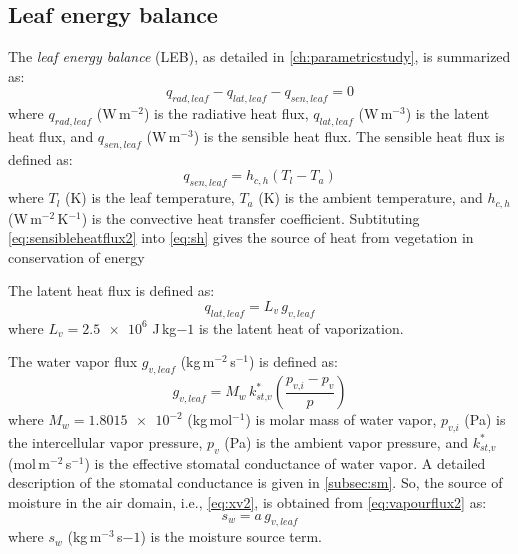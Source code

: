 \subsection*{Leaf energy balance}

The \textit{leaf energy balance} (LEB), as detailed in \cref{ch:parametricstudy}, is summarized as:
\begin{equation}
{q_{\mathit{rad},\mathit{leaf}}} - {q_{\mathit{lat},\mathit{leaf}}} - {q_{\mathit{sen},\mathit{leaf}}} = 0
\label{eq:energybalance2}
\end{equation}
where ${q_{\mathit{rad},\mathit{leaf}}}$ (W\,m$^{-2}$) is the radiative heat flux, ${q_{\mathit{lat},\mathit{leaf}}}$ (W\,m$^{-3}$) is the latent heat flux, and ${q_{\mathit{sen},\mathit{leaf}}}$ (W\,m$^{-3}$) is the sensible heat flux. The sensible heat flux is defined as:
\begin{equation}
{q_{\mathit{sen,leaf}}} = {h_{c,h}} \left( {{T_{\mathit{l}}} - T_a} \right)
\label{eq:sensibleheatflux2}
\end{equation}
where $T_l$ (K) is the leaf temperature, $T_a$ (K) is the ambient temperature, and ${h_{c,h}}$ (W\,m$^{-2}$\,K$^{-1}$) is the convective heat transfer coefficient. Subtituting \cref{eq:sensibleheatflux2} into \cref{eq:sh} gives the source of heat from vegetation in conservation of energy

The latent heat flux is defined as:
\begin{equation}
{q_{lat,leaf}} = {L_v} \, {g_{v,leaf}}
\label{eq:latentheatflux2}
\end{equation}
where $L_v=\num{2.5e6}$ J\,kg${-1}$ is the latent heat of vaporization. 

The water vapor flux $g_{v,leaf}$ (kg\,m$^{-2}$\,s$^{-1}$) is defined as:
\begin{equation}
{g_{\mathit{v,leaf}}} = M_w\, k_{\textit{st,v}}^* \left( \frac{p_{\textit{v,i}} - {p_v}}{p} \right)
\label{eq:vapourflux2}
\end{equation}
where $M_w = \num{1.8015e-2}$ (kg\,mol$^{-1}$) is molar mass of water vapor, $p_{\textit{v,i}}$ (Pa) is the intercellular vapor pressure, $p_v$ (Pa) is the ambient vapor pressure, and $k_{\textit{st,v}}^*$ (mol\,m$^{-2}$\,s$^{-1}$) is the effective stomatal conductance of water vapor. A detailed description of the stomatal conductance is given in \cref{subsec:sm}. So, the source of moisture in the air domain, i.e., \cref{eq:xv2}, is obtained from \cref{eq:vapourflux2} as:
\begin{equation}
s_w = a\,{g_{\mathit{v,leaf}}}
\label{eq:sw}
\end{equation}
where $s_w$ (kg\,m$^{-3}$\,s${-1}$) is the moisture source term. 

